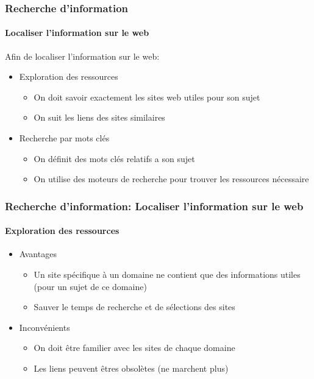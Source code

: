 \documentclass[xcolor=table]{beamer}
\begin{document}
\begin{frame}
\frametitle{Recherche d'information}
\framesubtitle{Localiser l'information sur le web}

Afin de localiser l'information sur le web: 
\begin{itemize}
	\item Exploration des ressources 
	\begin{itemize}
		\item On doit savoir exactement les sites web utiles pour son sujet 
		\item On suit les liens des sites similaires
	\end{itemize}
	\item Recherche par mots clés
	\begin{itemize}
		\item On définit des mots clés relatifs a son sujet  
		\item On utilise des moteurs de recherche pour trouver les ressources nécessaire
	\end{itemize}
\end{itemize} 

\end{frame}


\begin{frame}
\frametitle{Recherche d'information: Localiser l'information sur le web}
\framesubtitle{Exploration des ressources}

\begin{itemize}
	\item Avantages
	\begin{itemize}
		\item Un site spécifique à un domaine ne contient que des informations utiles (pour un sujet de ce domaine) 
		\item Sauver le temps de recherche et de sélections des sites 
	\end{itemize}
	\item Inconvénients
	\begin{itemize}
		\item On doit être familier avec les sites de chaque domaine 
		\item Les liens peuvent êtres obsolètes (ne marchent plus)
	\end{itemize}
\end{itemize} 

\end{frame}
\end{document}
